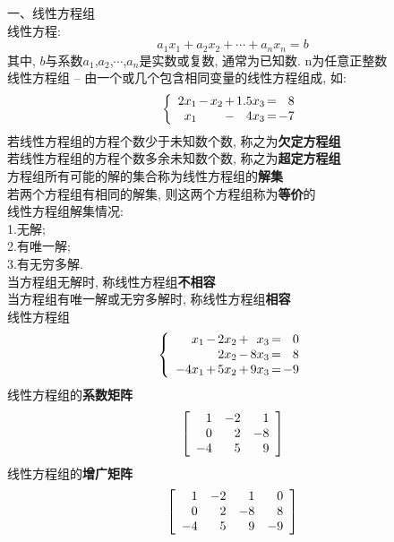 \documentclass[UTF8,fontset=ubuntu]{ctexart}
\theoremstyle{nonumberplain}
\theoremstyle{break}
\theoremstyle{empty}
\begin{document}
一、线性方程组\\[1ex]
线性方程:
	\[ a_{1}x_{1}+a_{2}x_{2}+\cdots +a_{n}x_{n}=b \]
其中, $b$与系数$a_{1}$,$a_{2}$,$\cdots$,$a_{n}$是实数或复数, 通常为已知数. n为任意正整数\\[2ex]

线性方程组 -- 由一个或几个包含相同变量的线性方程组成, 如:
\[\left\{\begin{array}{r@{\hspace{1.5pt}}l@{\hspace{1.5pt}}r@{\hspace{1.5pt}}l@{\hspace{1.5pt}}r@{\hspace{1.5pt}}l@{\hspace{1.5pt}}r}
	2x_1 & - & x_2 & + & 1.5x_3 & = & 8\\
	x_1  &   &     & - & 4x_3   & = & -7		
\end{array}\right.\]
若线性方程组的方程个数少于未知数个数, 称之为\textbf{欠定方程组}\\
若线性方程组的方程个数多余未知数个数, 称之为\textbf{超定方程组}\\
方程组所有可能的解的集合称为线性方程组的\textbf{解集}\\
若两个方程组有相同的解集, 则这两个方程组称为\textbf{等价}的\\[2ex]

线性方程组解集情况:\\
1.无解;\\
2.有唯一解;\\
3.有无穷多解.\\[1ex]
当方程组无解时, 称线性方程组\textbf{不相容}\\
当方程组有唯一解或无穷多解时, 称线性方程组\textbf{相容}\\[2ex]

线性方程组
\[\left\{\begin{array}{r@{\hspace{1.5pt}}l@{\hspace{1.5pt}}r@{\hspace{1.5pt}}l@{\hspace{1.5pt}}r@{\hspace{1.5pt}}l@{\hspace{1.5pt}}r}
x_1 & - & 2x_2 & + &  x_3 & = & 0\\
	& 	& 2x_2 & - & 8x_3 & = & 8\\
-4x_1 & + & 5x_2 & + & 9x_3 & = & -9
\end{array}\right.\]
线性方程组的\textbf{系数矩阵}
\[\left[\begin{array}{r r r}
	1 & -2 & 1\\
	0 & 2  & -8\\
	-4 & 5 & 9
\end{array}\right]\]
线性方程组的\textbf{增广矩阵}
\[\left[\begin{array}{r r r r}
	1 & -2 & 1 & 0\\
	0 & 2  & -8 & 8\\
	-4 & 5 & 9 & -9
\end{array}\right]\]\\[2ex]
\end{document}
